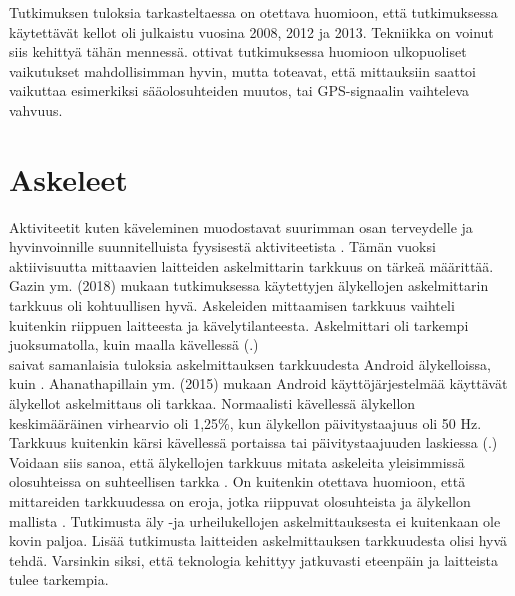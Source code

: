 \documentclass[utf8,bachelor,finnish]{bachelor}
\begin{document}
    Tutkimuksen tuloksia tarkasteltaessa on otettava huomioon, että tutkimuksessa käytettävät kellot oli julkaistu vuosina 2008, 2012 ja 2013. Tekniikka on voinut siis kehittyä tähän mennessä. 
     \textcite{ammann_accuracy_2016} ottivat tutkimuksessa huomioon ulkopuoliset vaikutukset mahdollisimman hyvin, mutta toteavat, että mittauksiin
      saattoi vaikuttaa esimerkiksi sääolosuhteiden muutos, tai GPS-signaalin vaihteleva vahvuus.\\

  \section{Askeleet}
  Aktiviteetit kuten käveleminen muodostavat suurimman osan terveydelle ja hyvinvoinnille suunnitelluista fyysisestä aktiviteetista \parencite{gaz_determining_2018}.
   Tämän vuoksi aktiivisuutta mittaavien laitteiden askelmittarin tarkkuus on tärkeä määrittää.
    Gazin ym. (2018) mukaan tutkimuksessa käytettyjen älykellojen askelmittarin tarkkuus oli kohtuullisen hyvä. Askeleiden mittaamisen tarkkuus
     vaihteli kuitenkin riippuen laitteesta ja kävelytilanteesta. Askelmittari oli tarkempi juoksumatolla, kuin
      maalla kävellessä (\cite{gaz_determining_2018}.)\\
  
  \textcite{ahanathapillai_preliminary_2015} saivat samanlaisia tuloksia askelmittauksen tarkkuudesta Android älykelloissa, kuin \textcite{gaz_determining_2018}.
   Ahanathapillain ym. (2015) mukaan Android käyttöjärjestelmää käyttävät älykellot askelmittaus oli tarkkaa.
    Normaalisti kävellessä älykellon keskimääräinen virhearvio oli 1,25\%, kun älykellon päivitystaajuus oli 50 Hz.
     Tarkkuus kuitenkin kärsi kävellessä portaissa tai päivitystaajuuden laskiessa (\cite{ahanathapillai_preliminary_2015}.)\\
  
  Voidaan siis sanoa, että älykellojen tarkkuus mitata askeleita yleisimmissä olosuhteissa on suhteellisen tarkka
   \parencite{gaz_determining_2018,ahanathapillai_preliminary_2015}. On kuitenkin otettava huomioon, että mittareiden
    tarkkuudessa on eroja, jotka riippuvat olosuhteista ja älykellon mallista \parencite{gaz_determining_2018}.
     Tutkimusta äly -ja urheilukellojen askelmittauksesta ei kuitenkaan ole kovin paljoa.
      Lisää tutkimusta laitteiden askelmittauksen tarkkuudesta olisi hyvä tehdä.
       Varsinkin siksi, että teknologia kehittyy jatkuvasti eteenpäin ja laitteista tulee tarkempia.
  
\end{document}
